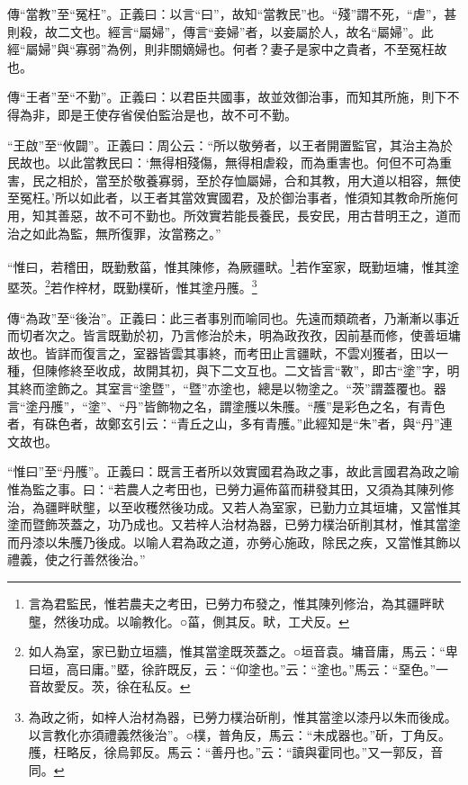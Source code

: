 {\noindent\zhuan{}\fzbyks 傳“當教”至“冤枉”。正義曰：以言“曰”，故知“當教民”也。“殘”謂不死，“虐”，甚則殺，故二文也。經言“屬婦”，傳言“妾婦”者，以妾屬於人，故名“屬婦”。此經“屬婦”與“寡弱”為例，則非關嫡婦也。何者？妻子是家中之貴者，不至冤枉故也。 \par}

{\noindent\zhuan{}\fzbyks 傳“王者”至“不勤”。正義曰：以君臣共國事，故並效御治事，而知其所施，則下不得為非，即是王使存省侯伯監治是也，故不可不勤。 \par}

{\noindent\shu{}\fzkt “王啟”至“攸闢”。正義曰：周公云：“所以敬勞者，以王者開置監官，其治主為於民故也。以此當教民曰：‘無得相殘傷，無得相虐殺，而為重害也。何但不可為重害，民之相於，當至於敬養寡弱，至於存恤屬婦，合和其教，用大道以相容，無使至冤枉。’所以如此者，以王者其當效實國君，及於御治事者，惟須知其教命所施何用，知其善惡，故不可不勤也。所效實若能長養民，長安民，用古昔明王之，道而治之如此為監，無所復罪，汝當務之。” \par}

“惟曰，若稽田，既勤敷菑，惟其陳修，為厥疆畎。\footnote{言為君監民，惟若農夫之考田，已勞力布發之，惟其陳列修治，為其疆畔畎壟，然後功成。以喻教化。○菑，側其反。畎，工犬反。}若作室家，既勤垣墉，惟其塗塈茨。\footnote{如人為室，家已勤立垣牆，惟其當塗既茨蓋之。○垣音袁。墉音庸，馬云：“卑曰垣，高曰庸。”塈，徐許既反，云：“仰塗也。”云：“塗也。”馬云：“堊色。”一音故愛反。茨，徐在私反。}若作梓材，既勤樸斫，惟其塗丹雘。\footnote{為政之術，如梓人治材為器，已勞力樸治斫削，惟其當塗以漆丹以朱而後成。以言教化亦須禮義然後治”。○樸，普角反，馬云：“未成器也。”斫，丁角反。雘，枉略反，徐烏郭反。馬云：“善丹也。”云：“讀與霍同也。”又一郭反，音同。}


{\noindent\zhuan{}\fzbyks 傳“為政”至“後治”。正義曰：此三者事別而喻同也。先遠而類疏者，乃漸漸以事近而切者次之。皆言既勤於初，乃言修治於未，明為政孜孜，因前基而修，使善垣墉故也。皆詳而復言之，室器皆雲其事終，而考田止言疆畎，不雲刈獲者，田以一種，但陳修終至收成，故開其初，與下二文互也。二文皆言“斁”，即古“塗”字，明其終而塗飾之。其室言“塗暨”，“暨”亦塗也，總是以物塗之。“茨”謂蓋覆也。器言“塗丹雘”，“塗”、“丹”皆飾物之名，謂塗雘以朱雘。“雘”是彩色之名，有青色者，有硃色者，故鄭玄引云：“青丘之山，多有青雘。”此經知是“朱”者，與“丹”連文故也。 \par}

{\noindent\shu{}\fzkt “惟曰”至“丹雘”。正義曰：既言王者所以效實國君為政之事，故此言國君為政之喻惟為監之事。曰：“若農人之考田也，已勞力遍佈菑而耕發其田，又須為其陳列修治，為疆畔畎壟，以至收穫然後功成。又若人為室家，已勤力立其垣墉，又當惟其塗而暨飾茨蓋之，功乃成也。又若梓人治材為器，已勞力樸治斫削其材，惟其當塗而丹漆以朱雘乃後成。以喻人君為政之道，亦勞心施政，除民之疾，又當惟其飾以禮義，使之行善然後治。” \par}

